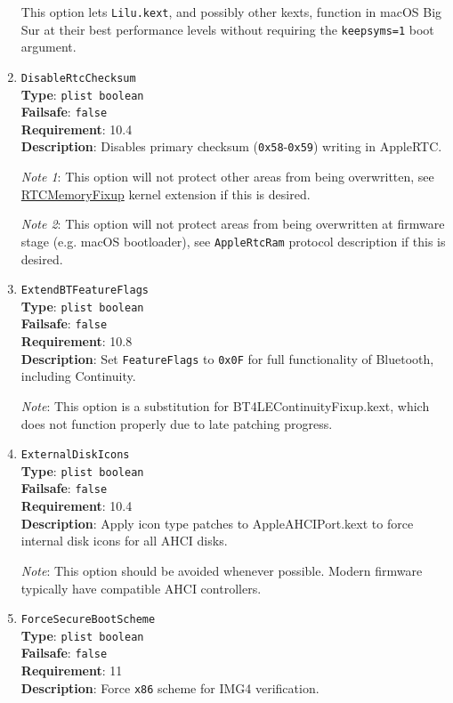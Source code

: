 \documentclass[]{article}
\begin{document}
\begin{enumerate}
  This option lets \texttt{Lilu.kext}, and possibly other kexts, function
  in macOS Big Sur at their best performance levels without requiring the
  \texttt{keepsyms=1} boot argument.

\item
  \texttt{DisableRtcChecksum}\\
  \textbf{Type}: \texttt{plist\ boolean}\\
  \textbf{Failsafe}: \texttt{false}\\
  \textbf{Requirement}: 10.4\\
  \textbf{Description}: Disables primary checksum (\texttt{0x58}-\texttt{0x59})
  writing in AppleRTC.

  \emph{Note 1}: This option will not protect other areas from being overwritten,
  see \href{https://github.com/acidanthera/RTCMemoryFixup}{RTCMemoryFixup}
  kernel extension if this is desired.

  \emph{Note 2}: This option will not protect areas from being overwritten
  at firmware stage (e.g. macOS bootloader), see \texttt{AppleRtcRam} protocol
  description if this is desired.

\item
  \texttt{ExtendBTFeatureFlags}\\
  \textbf{Type}: \texttt{plist\ boolean}\\
  \textbf{Failsafe}: \texttt{false}\\
  \textbf{Requirement}: 10.8\\
  \textbf{Description}: Set \texttt{FeatureFlags} to \texttt{0x0F} for full
  functionality of Bluetooth, including Continuity.

  \emph{Note}: This option is a substitution for BT4LEContinuityFixup.kext,
  which does not function properly due to late patching progress.

\item
  \texttt{ExternalDiskIcons}\\
  \textbf{Type}: \texttt{plist\ boolean}\\
  \textbf{Failsafe}: \texttt{false}\\
  \textbf{Requirement}: 10.4\\
  \textbf{Description}: Apply icon type patches to AppleAHCIPort.kext to force
  internal disk icons for all AHCI disks.

  \emph{Note}: This option should be avoided whenever possible. Modern firmware
  typically have compatible AHCI controllers.

\item
  \texttt{ForceSecureBootScheme}\\
  \textbf{Type}: \texttt{plist\ boolean}\\
  \textbf{Failsafe}: \texttt{false}\\
  \textbf{Requirement}: 11\\
  \textbf{Description}: Force \texttt{x86} scheme for IMG4 verification.


\end{enumerate}
\end{document}
